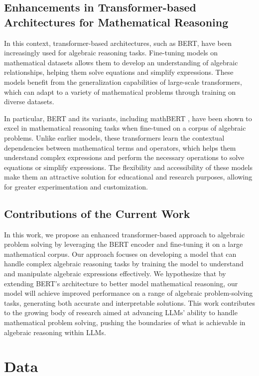\documentclass{article}
\begin{document}
\subsection{Enhancements in Transformer-based Architectures for Mathematical Reasoning}

In this context, transformer-based architectures, such as BERT, have been increasingly used for algebraic reasoning tasks. Fine-tuning models on mathematical datasets allows them to develop an understanding of algebraic relationships, helping them solve equations and simplify expressions. These models benefit from the generalization capabilities of large-scale transformers, which can adapt to a variety of mathematical problems through training on diverse datasets.

In particular, BERT and its variants, including mathBERT \cite{mathBERT}, have been shown to excel in mathematical reasoning tasks when fine-tuned on a corpus of algebraic problems. Unlike earlier models, these transformers learn the contextual dependencies between mathematical terms and operators, which helps them understand complex expressions and perform the necessary operations to solve equations or simplify expressions. The flexibility and accessibility of these models make them an attractive solution for educational and research purposes, allowing for greater experimentation and customization.

\subsection{Contributions of the Current Work}

In this work, we propose an enhanced transformer-based approach to algebraic problem solving by leveraging the BERT encoder and fine-tuning it on a large mathematical corpus. Our approach focuses on developing a model that can handle complex algebraic reasoning tasks by training the model to understand and manipulate algebraic expressions effectively. We hypothesize that by extending BERT's architecture to better model mathematical reasoning, our model will achieve improved performance on a range of algebraic problem-solving tasks, generating both accurate and interpretable solutions. This work contributes to the growing body of research aimed at advancing LLMs' ability to handle mathematical problem solving, pushing the boundaries of what is achievable in algebraic reasoning within LLMs.


\section{Data}
\end{document}
